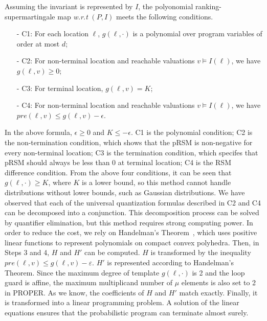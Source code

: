 \documentclass[runningheads]{llncs}
\newcommand\yx[1]{{\color{red} [YD: #1]}}
\begin{document}
Assuming the invariant is represented by $I$, the polyonomial ranking-supermartingale map \textit{w.r.t} $(P,I)$ meets the following conditions.
\begin{itemize}
	\item[-] C1: For each location $\ell$, $g(\ell,\cdot)$ is a polynomial over program variables of order at most $d$;
	\item[-] C2: For non-terminal location and reachable
	valuations $v \vDash I(\ell)$, we have $g(\ell,v) \geq 0$;
	\item[-] C3: For terminal location, $g(\ell,v)=K$;
	\item[-] C4: For non-terminal location and reachable
	valuations $v \vDash I(\ell)$, we have $pre(\ell,v) \leq g(\ell,v)-\epsilon$.
\end{itemize}
In the above formula, $\epsilon \geq 0$ and $K \leq -\epsilon$. C1 is the polynomial condition; C2 is the non-termination condition, which shows that the pRSM is non-negative for every non-terminal location; C3 is the termination condition, which specifes that pRSM should always be less than 0 at terminal location;
C4 is the RSM difference condition. From the above four conditions, it can be seen that $g(\ell,\cdot) \geq K$, where $K$ is a lower bound, so this method cannot handle distributions without lower bounds, such as Gaussian distributions.
We have observed that each of the universal quantization formulas described in C2 and C4 can be decomposed into a conjunction. This decomposition process can be solved by quantifier elimination, but this method requires strong computing power. In order to reduce the cost, we rely on Handelman's Theorem~\cite{Handelman1988}, which uses positive linear functions to represent polynomials on compact convex polyhedra. 
Then, in Steps 3 and 4, $H$ and $H'$ can be computed. $H$ is transformed by the inequality $pre(\ell,v)\leq g(\ell,v)-\varepsilon$. $H'$ is represented according to Handelman's Theorem. Since the maximum degree of template $g(\ell,\cdot)$ is 2 and the loop guard is affine, the maximum multiplicand number of $\mu$ elements is also set to 2 in PROPER. As we know, the coefficients of $H$ and $H'$ match exactly. Finally, it is transformed into a linear programming problem. %
A solution of the linear equations ensures that the probabilistic program can terminate almost surely.
\end{document}
